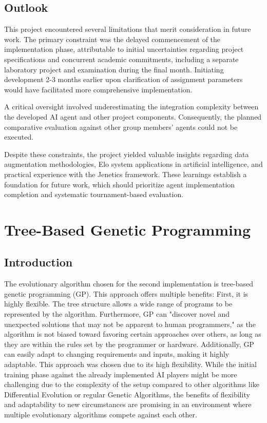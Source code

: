 \documentclass[sigconf]{acmart} %
\begin{document}
\subsection{Outlook}
This project encountered several limitations that merit consideration in future work. The primary constraint was the delayed commencement of the implementation phase, attributable to initial uncertainties regarding project specifications and concurrent academic commitments, including a separate laboratory project and examination during the final month. Initiating development 2-3 months earlier upon clarification of assignment parameters would have facilitated more comprehensive implementation.

A critical oversight involved underestimating the integration complexity between the developed AI agent and other project components. Consequently, the planned comparative evaluation against other group members' agents could not be executed. 

Despite these constraints, the project yielded valuable insights regarding data augmentation methodologies, Elo system applications in artificial intelligence, and practical experience with the Jenetics framework. These learnings establish a foundation for future work, which should prioritize agent implementation completion and systematic tournament-based evaluation.


\section{Tree-Based Genetic Programming}
\subsection{Introduction}

The evolutionary algorithm chosen for the second implementation is tree-based genetic programming (GP). This approach offers multiple benefits: 
First, it is highly flexible. The tree structure allows a wide range of programs to be represented by the algorithm. 
Furthermore, GP can "discover novel and unexpected solutions that may not be apparent to human programmers," as the algorithm is not biased toward favoring certain approaches over others, as long as they are within the rules set by the programmer or hardware. 
Additionally, GP can easily adapt to changing requirements and inputs, making it highly adaptable. 
This approach was chosen due to its high flexibility. While the initial training phase against the already implemented AI players might be more challenging due to the complexity of the setup compared to other algorithms like Differential Evolution or regular Genetic Algorithms, the benefits of flexibility and adaptability to new circumstances are promising in an environment where multiple evolutionary algorithms compete against each other. 
\end{document}
